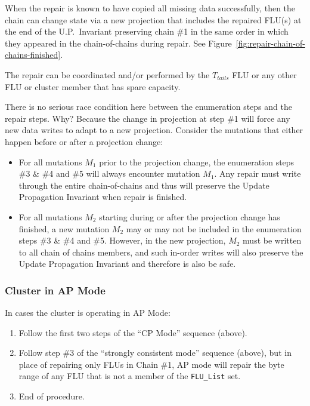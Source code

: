 \documentclass[preprint,10pt]{sigplanconf}
\begin{document}
When the repair is known to have copied all missing data successfully,
then the chain can change state via a new projection that includes the
repaired FLU(s) at the end of the U.P.~Invariant preserving chain \#1
in the same order in which they appeared in the chain-of-chains during
repair.  See Figure~\ref{fig:repair-chain-of-chains-finished}.

The repair can be coordinated and/or performed by the $T_{tails}$ FLU
or any other FLU or cluster member that has spare capacity.

There is no serious race condition here between the enumeration steps
and the repair steps.  Why?  Because the change in projection at
step \#1 will force any new data writes to adapt to a new projection.
Consider the mutations that either happen before or after a projection
change:


\begin{itemize}

\item For all mutations $M_1$ prior to the projection change, the
  enumeration steps \#3 \& \#4 and \#5 will always encounter mutation
  $M_1$.  Any repair must write through the entire chain-of-chains and
  thus will preserve the Update Propagation Invariant when repair is
  finished.

\item For all mutations $M_2$ starting during or after the projection
  change has finished, a new mutation $M_2$ may or may not be included in the
  enumeration steps \#3 \& \#4 and \#5.
  However, in the new projection, $M_2$ must be
  written to all chain of chains members, and such
  in-order writes will also preserve the Update
  Propagation Invariant and therefore is also be safe.

\end{itemize}

\subsubsection{Cluster in AP Mode}

In cases the cluster is operating in AP Mode:

\begin{enumerate}
\item Follow the first two steps of the ``CP Mode''
  sequence (above).
\item Follow step \#3 of the ``strongly consistent mode'' sequence
  (above), but in place of repairing only FLUs in Chain \#1, AP mode
  will repair the byte range of any FLU that is not a member of the
  {\tt FLU\_List} set.
\item End of procedure.
\end{enumerate}
\end{document}
